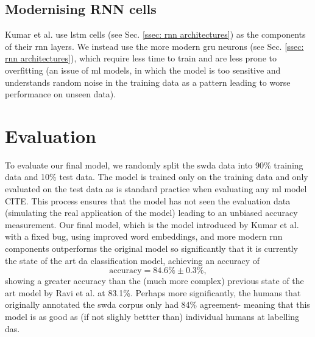     \subsection{Modernising RNN cells}
    Kumar et al.\cite{kumar2017dialogue} use \gls{lstm} cells (see Sec. \ref{ssec: rnn architectures}) as the components of their \gls{rnn} layers. We instead use the more modern \gls{gru}\cite{chung2014empirical} \glspl{neuron} (see Sec. \ref{ssec: rnn architectures}), which require less time to train and are less prone to overfitting (an issue of \gls{ml} models, in which the \gls{model} is too sensitive and understands random noise in the training data as a pattern leading to worse performance on unseen data)\cite{chung2014empirical}.

    \section{Evaluation \label{ssec: method my da model evaluation}}

    To evaluate our final \gls{model}, we randomly split the \gls{swda} data into 90\% training data and 10\% test data. The \gls{model} is trained only on the training data and only evaluated on the test data as is standard practice when evaluating any \gls{ml} \gls{model} CITE. This process ensures that the \gls{model} has not seen the evaluation data (simulating the real application of the \gls{model}) leading to an unbiased accuracy measurement.
    Our final \gls{model}, which is the \gls{model} introduced by Kumar et al.\cite{kumar2017dialogue} with a fixed bug, using improved word \glspl{embedding}, and more modern \gls{rnn} components outperforms the original \gls{model} so significantly that it is currently the state of the art \gls{da} classification \gls{model}, achieving an accuracy of
    \begin{equation}
        \text{accuracy} = 84.6 \% \pm 0.3\%,
        \label{eq: my da model accuracy}
    \end{equation}
    showing a greater accuracy than the (much more complex) previous state of the art \gls{model} by Ravi et al. at 83.1\%\cite{ravi2018self}. Perhaps more significantly, the humans that originally annotated the \gls{swda} corpus only had 84\% agreement\cite{swda}- meaning that this \gls{model} is as good as (if not slighly bettter than) individual humans at labelling \glspl{da}. \newline
